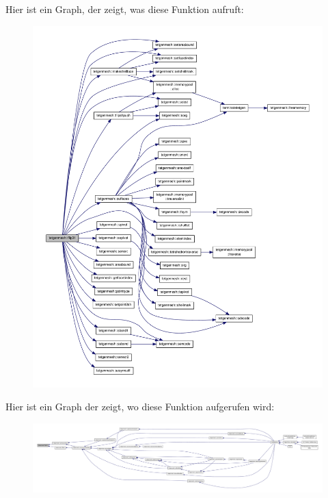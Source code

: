 Hier ist ein Graph, der zeigt, was diese Funktion aufruft\-:
\nopagebreak
\begin{figure}[H]
\begin{center}
\leavevmode
\includegraphics[width=350pt]{classtetgenmesh_a3db30cb237ac5cbcda3ac70a1ea31666_cgraph}
\end{center}
\end{figure}




Hier ist ein Graph der zeigt, wo diese Funktion aufgerufen wird\-:
\nopagebreak
\begin{figure}[H]
\begin{center}
\leavevmode
\includegraphics[width=350pt]{classtetgenmesh_a3db30cb237ac5cbcda3ac70a1ea31666_icgraph}
\end{center}
\end{figure}


